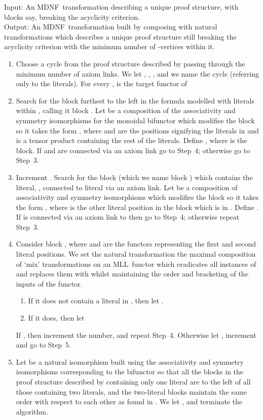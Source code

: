 \documentclass{LMCS}
\theoremstyle{plain}\newtheorem*{cLm}{Claim}
\newcommand{\mll}{MLL} \newcommand{\mall}{MALL}
\begin{document}
    \begin{algo} \label{MixCycleAlg}
    Input: An MDNF~transformation  describing a unique proof structure, with  blocks say, breaking the acyclicity criterion. \\
    Output: An MDNF~transformation  built by composing  with natural transformations which describes a unique proof structure still breaking the acyclicity criterion with the minimum number of -vertices within it.
    \end{algo}
    \begin{enumerate}
    \item Choose a cycle from the proof structure described by  passing through the minimum number of axiom links. We let , ,  , and we name the cycle  (referring only to the literals). For every ,  is the target functor of 
    \item Search for the block furthest to the left in the formula modelled with literals within , calling it block . Let  be a composition of the associativity and symmetry isomorphisms for the monoidal bifunctor  which modifies the block so it takes the form , where  and  are the positions signifying the literals in  and  is a tensor product containing the rest of the literals. Define , where  is the  block. If  and  are connected via an axiom link go to Step~4; otherwise go to Step~3.
    \item Increment . Search for the block (which we name block ) which contains the literal, , connected to literal  via an axiom link. Let  be a composition of associativity and symmetry isomorphisms which modifies the block so it takes the form , where  is the other literal position in the block which is in . Define . If  is connected via an axiom link to  then go to Step~4; otherwise repeat Step~3.
    \item Consider block ,  where  and  are the functors representing the first and second literal positions. We set the natural transformation  the maximal composition of `mix' transformations on an \mll~functor  which eradicates all instances of  and replaces them with  whilst maintaining the order and bracketing of the inputs of the functor.
    	\begin{enumerate}
    	\item If it does not contain a literal in , then let .
    	\item If it does, then let 
    	\end{enumerate}
    If , then increment the number, and repeat Step~4. Otherwise let \linebreak , increment  and go to Step~5.
    \item Let  be a natural isomorphism built using the associativity and symmetry isomorphisms corresponding to the bifunctor  so that all the blocks in the proof structure described by  containing only one literal are to the left of all those containing two literals, and the two-literal blocks maintain the same order with respect to each other as found in . We let , and terminate the algorithm.
    \end{enumerate}
    
\end{document}
